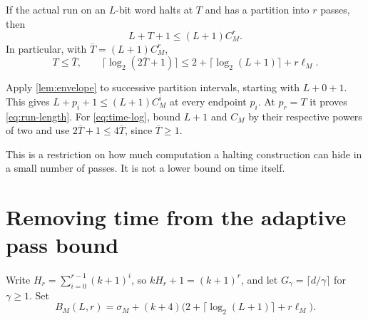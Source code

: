 \begin{theorem}\label{thm:run-length}
If the actual run on an $L$-bit word halts at $T$ and has a partition into
$r$ passes, then
\begin{equation}\label{eq:run-length}
 L+T+1\le (L+1)C_M^r.
\end{equation}
In particular, with $\overline T=(L+1)C_M^r$,
\begin{equation}\label{eq:time-log}
 T\le\overline T,\qquad
 \lceil\log_2(2\overline T+1)\rceil
 \le 2+\lceil\log_2(L+1)\rceil+r\ell_M.
\end{equation}
\end{theorem}
\begin{outline}
Apply \cref{lem:envelope} to successive partition intervals, starting with
$L+0+1$. This gives $L+p_i+1\le(L+1)C_M^i$ at every endpoint $p_i$.
At $p_r=T$ it proves \cref{eq:run-length}. For \cref{eq:time-log}, bound
$L+1$ and $C_M$ by their respective powers of two and use
$2\overline T+1\le4\overline T$, since $\overline T\ge1$.
\end{outline}
This is a restriction on how much computation a halting construction can
hide in a small number of passes. It is not a lower bound on time itself.

\section{Removing time from the adaptive pass bound}\label{sec:adaptive}
Write $H_r=\sum_{i=0}^{r-1}(k+1)^i$, so $kH_r+1=(k+1)^r$, and let
$G_\gamma=\lceil d/\gamma\rceil$ for $\gamma\ge1$. Set
\[
 B_M(L,r)=\sigma_M+(k+4)
   \bigl(2+\lceil\log_2(L+1)\rceil+r\ell_M\bigr).
\]

